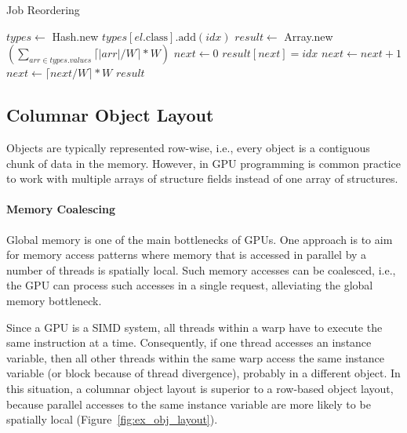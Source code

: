 \documentclass[preprint]{sigplanconf}
\begin{document}
\begin{algorithm}
\caption{Job Reordering}
\label{CHalgorithm}
\begin{algorithmic}[1]
\State $\mathit{types} \gets$ Hash.new
    \State $\mathit{types}[\mathit{el}.\mbox{class}].\mbox{add}(\mathit{idx})$
\EndFor
\State $\mathit{result} \gets$ Array.new$(\sum_{\mathit{arr} \in \mathit{types}.\mathit{values}} \lceil |\mathit{arr}| / W \rceil * W)$
\State $\mathit{next} \gets 0$
        \State $\mathit{result}[\mathit{next}] = \mathit{idx}$
        \State $\mathit{next} \gets \mathit{next} + 1$
    \EndFor
    \State $\mathit{next} \gets \lceil \mathit{next} / W \rceil * W$
\EndFor
\State \Return $\mathit{result}$
\EndProcedure
\end{algorithmic}
\end{algorithm}


\subsection{Columnar Object Layout}
Objects are typically represented row-wise, i.e., every object is a contiguous chunk of data in the memory. However, in GPU programming is common practice to work with multiple arrays of structure fields instead of one array of structures.

\paragraph{Memory Coalescing}
Global memory is one of the main bottlenecks of GPUs. One approach is to aim for memory access patterns where memory that is accessed in parallel by a number of threads is spatially local. Such memory accesses can be coalesced, i.e., the GPU can process such accesses in a single request, alleviating the global memory bottleneck.

Since a GPU is a SIMD system, all threads within a warp have to execute the same instruction at a time. Consequently, if one thread accesses an instance variable, then all other threads within the same warp access the same instance variable (or block because of thread divergence), probably in a different object. In this situation, a columnar object layout is superior to a row-based object layout, because parallel accesses to the same instance variable are more likely to be spatially local (Figure~\ref{fig:ex_obj_layout}).
\end{document}
